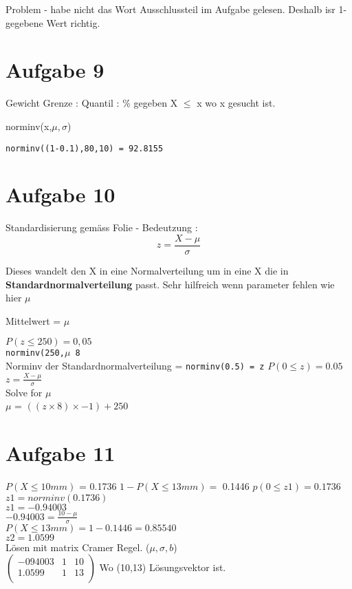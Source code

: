 \documentclass[a4paper,10pt]{scrbook}
\begin{document}
Problem - habe nicht das Wort Ausschlussteil im Aufgabe gelesen. Deshalb isr 1- gegebene Wert richtig.

\section*{Aufgabe 9}
Gewicht Grenze : Quantil : \% gegeben X $\le$ x wo x gesucht ist.
\begin{framed}
 norminv(x,$\mu,\sigma$)
\end{framed}

\texttt{norminv((1-0.1),80,10) = 92.8155}

\section*{Aufgabe 10}
\begin{framed}
 Standardisierung gemäss Folie - Bedeutzung :
 \begin{equation}
z = \frac{X-\mu}{\sigma} 
\end{equation}

Dieses wandelt den X in eine Normalverteilung um in eine X die in \textbf{Standardnormalverteilung} passt.
Sehr hilfreich wenn parameter fehlen wie hier $\mu$

Mittelwert = $\mu$
\end{framed}

$ P(z \leq 250) = 0,05$ \\
\texttt{norminv(250,$\mu$ 8}\\
Norminv der Standardnormalverteilung = \texttt{norminv(0.5) = z}
$P(0 \leq z) = 0.05$\\
$ z = \frac{X-\mu}{\sigma}$ \\
Solve for $\mu$ \\
$\mu$ = $((z \times 8) \times -1 )+ 250$ 

\section*{Aufgabe 11}
$P(X \leq 10mm)$ = 0.1736 
$1-P(X\leq 13mm) =$ 0.1446
$p(0 \leq z1) = 0.1736$\\
$z1 = norminv(0.1736)$ \\
$z1 = -0.94003$ \\
$ -0.94003 = \frac{10-\mu}{\sigma}$ \\
$ P(X \leq 13mm) = 1-0.1446 = 0.85540$ \\
$ z2 = 1.0599$ \\

Lösen mit matrix  Cramer Regel. ($\mu,\sigma,b$)\\
$\begin{pmatrix}
   -094003 & 1 & 10\\
   1.0599 & 1 & 13 \\
 \end{pmatrix}$
Wo (10,13) Lösungsvektor ist.
\end{document}
